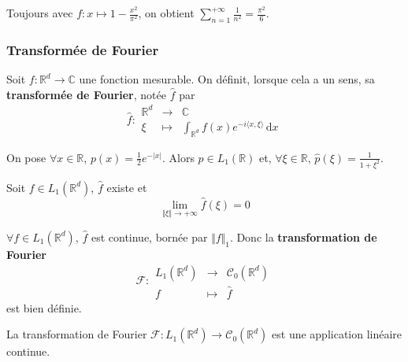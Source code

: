   \begin{example}
    Toujours avec $f : x \mapsto 1 - \frac{x^2}{\pi^2}$, on obtient $\sum_{n=1}^{+\infty} \frac{1}{n^2} = \frac{\pi^2}{6}$.
  \end{example}

  \subsubsection{Transformée de Fourier}


  \begin{definition}
    Soit $f : \mathbb{R}^d \rightarrow \mathbb{C}$ une fonction mesurable. On définit, lorsque cela a un sens, sa \textbf{transformée de Fourier}, notée $\widehat{f}$ par
    \[
    \widehat{f} :
    \begin{array}{ccc}
      \mathbb{R}^d &\rightarrow& \mathbb{C} \\
      \xi &\mapsto& \int_{\mathbb{R}^d} f(x) e^{-i \langle x, \xi \rangle} \, \mathrm{d}x
    \end{array}
    \]
  \end{definition}

  \begin{example}
    On pose $\forall x \in \mathbb{R}$, $p(x) = \frac{1}{2} e^{-|x|}$. Alors $p \in L_1(\mathbb{R})$ et, $\forall \xi \in \mathbb{R}$, $\widehat{p}(\xi) = \frac{1}{1+\xi^2}$.
  \end{example}

  \begin{lemma}
    Soit $f \in L_1(\mathbb{R}^d)$, $\widehat{f}$ existe et
    \[ \lim_{\Vert \xi \Vert \rightarrow +\infty} \widehat{f}(\xi) = 0 \]
  \end{lemma}

  \begin{theorem}
    $\forall f \in L_1(\mathbb{R}^d)$, $\widehat{f}$ est continue, bornée par $\Vert f \Vert_1$. Donc la \textbf{transformation de Fourier}
    \[
    \mathcal{F} :
    \begin{array}{ccc}
      L_1(\mathbb{R}^d) &\rightarrow& \mathcal{C}_0(\mathbb{R}^d) \\
      f &\mapsto& \widehat{f}
    \end{array}
    \]
    est bien définie.
  \end{theorem}

  \begin{corollary}
    La transformation de Fourier $\mathcal{F} : L_1(\mathbb{R}^d) \rightarrow \mathcal{C}_0(\mathbb{R}^d)$ est une application linéaire continue.
  \end{corollary}

